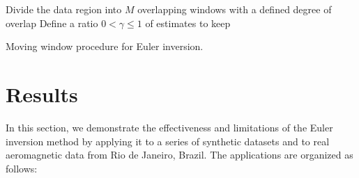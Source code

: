 \begin{algorithm}[!h]
  Divide the data region into $M$ overlapping windows with a defined degree of
  overlap
  \;
  Define a ratio $0 < \gamma \le 1$ of estimates to keep
  \;
  \BlankLine
  \caption{Moving window procedure for Euler inversion.}
  \label{alg:window}
\end{algorithm}


\section{Results}

In this section, we demonstrate the effectiveness and limitations of the Euler
inversion method by applying it to a series of synthetic datasets and to real
aeromagnetic data from Rio de Janeiro, Brazil.
The applications are organized as follows:

